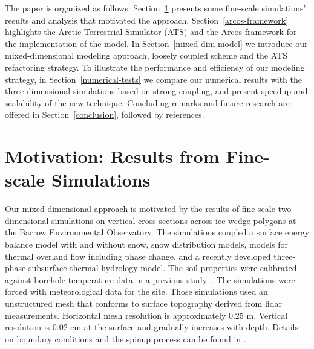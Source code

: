 \documentclass[review]{elsarticle}
\begin{document}
The paper is organized as follows: Section~\ref{motivation} presents some fine-scale simulations' results and analysis that motivated the approach. Section~\ref{arcos-framework} highlights the Arctic Terrestrial Simulator (ATS) and the Arcos framework for the implementation of the model. In Section~\ref{mixed-dim-model} we introduce our mixed-dimensional modeling approach, loosely coupled scheme and the ATS refactoring strategy. To illustrate the performance and efficiency of our modeling strategy, in Section~\ref{numerical-tests} we compare our numerical results with the three-dimensional simulations based on strong coupling, and present speedup and scalability of the new technique. Concluding remarks and future research are offered in Section~\ref{conclusion}, followed by references.


\section{Motivation: Results from Fine-scale Simulations}\label{motivation}

Our mixed-dimensional approach is motivated by the results of fine-scale two-dimensional simulations on vertical cross-sections across ice-wedge polygons at the Barrow Environmental Observatory. The simulations coupled a surface energy balance model with and without snow, snow distribution models, models for thermal overland flow including phase change, and a recently developed three-phase subsurface thermal hydrology model. The soil properties were calibrated against borehole temperature data in a previous study~\cite{atchley2015}. The simulations were forced with meteorological data for the site. Those simulations used an unstructured mesh that conforms to surface topography derived from lidar measurements. Horizontal mesh resolution is approximately 0.25 m. Vertical resolution is 0.02 cm at the surface and gradually increases with depth. Details on boundary conditions and the spinup process can be found in \cite{spainter2016integrated}. 
\end{document}
